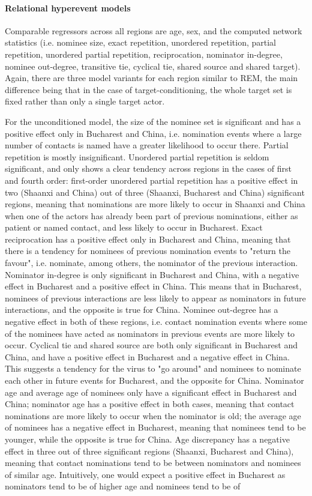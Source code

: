 \paragraph{Relational hyperevent models} Comparable regressors across all regions are age, sex, and the computed network statistics (i.e. nominee size, exact repetition, unordered repetition, partial repetition, unordered partial repetition, reciprocation, nominator in-degree, nominee out-degree, transitive tie, cyclical tie, shared source and shared target). Again, there are three model variants for each region similar to REM, the main difference being that in the case of target-conditioning, the whole target set is fixed rather than only a single target actor. 

For the unconditioned model, the size of the nominee set is significant and has a positive effect only in Bucharest and China, i.e. nomination events where a large number of contacts is named have a greater likelihood to occur there. Partial repetition is mostly insignificant. Unordered partial repetition is seldom significant, and only shows a clear tendency across regions in the cases of first and fourth order: first-order unordered partial repetition has a positive effect in two (Shaanxi and China) out of three (Shaanxi, Bucharest and China) significant regions, meaning that nominations are more likely to occur in Shaanxi and China when one of the actors has already been part of previous nominations, either as patient or named contact, and less likely to occur in Bucharest. Exact reciprocation has a positive effect only in Bucharest and China, meaning that there is a tendency for nominees of previous nomination events to "return the favour", i.e. nominate, among others, the nominator of the previous interaction. Nominator in-degree is only significant in Bucharest and China, with a negative effect in Bucharest and a positive effect in China. This means that in Bucharest, nominees of previous interactions are less likely to appear as nominators in future interactions, and the opposite is true for China. Nominee out-degree has a negative effect in both of these regions, i.e. contact nomination events where some of the nominees have acted as nominators in previous events are more likely to occur. Cyclical tie and shared source are both only significant in Bucharest and China, and have a positive effect in Bucharest and a negative effect in China. This suggests a tendency for the virus to "go around" and nominees to nominate each other in future events for Bucharest, and the opposite for China. Nominator age and average age of nominees only have a significant effect in Bucharest and China; nominator age has a positive effect in both cases, meaning that contact nominations are more likely to occur when the nominator is old; the average age of nominees has a negative effect in Bucharest, meaning that nominees tend to be younger, while the opposite is true for China. Age discrepancy has a negative effect in three out of three significant regions (Shaanxi, Bucharest and China), meaning that contact nominations tend to be between nominators and nominees of similar age. Intuitively, one would expect a positive effect in Bucharest as nominators tend to be of higher age and nominees tend to be of 